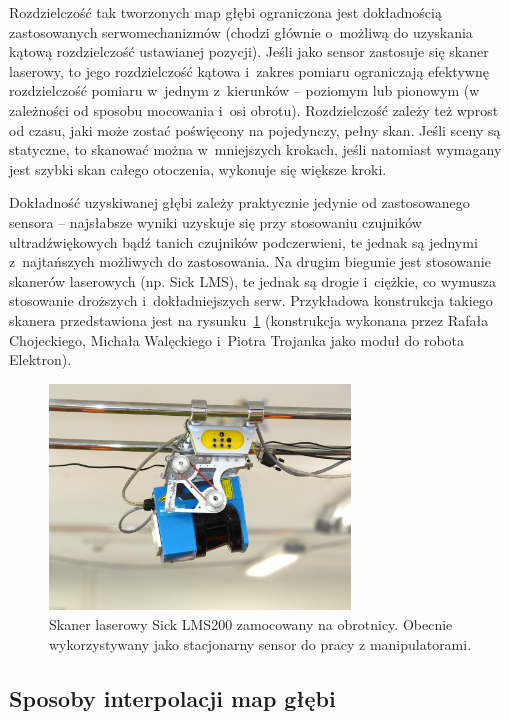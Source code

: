 Rozdzielczość tak tworzonych map głębi ograniczona jest dokładnością
zastosowanych serwomechanizmów (chodzi głównie o~możliwą do uzyskania
kątową rozdzielczość ustawianej pozycji). Jeśli jako sensor zastosuje się
skaner laserowy, to jego rozdzielczość kątowa i~zakres pomiaru ograniczają
efektywnę rozdzielczość pomiaru w~jednym z~kierunków -- poziomym lub pionowym
(w zależności od sposobu mocowania i~osi obrotu). Rozdzielczość zależy też
wprost od czasu, jaki może zostać poświęcony na pojedynczy, pełny skan. Jeśli
sceny są statyczne, to skanować można w~mniejszych krokach, jeśli natomiast
wymagany jest szybki skan całego otoczenia, wykonuje się większe kroki.

Dokładność uzyskiwanej głębi zależy praktycznie jedynie od
zastosowanego sensora -- najsłabsze wyniki uzyskuje się przy stosowaniu
czujników ultradźwiękowych bądź tanich czujników podczerwieni, te jednak są
jednymi z~najtańszych możliwych do zastosowania. Na drugim biegunie jest
stosowanie skanerów laserowych (np. Sick LMS), te jednak są drogie i~ciężkie, co
wymusza stosowanie droższych i~dokładniejszych serw. Przykładowa konstrukcja
takiego skanera przedstawiona jest na rysunku~\ref{fig:sick_obrotnica}
(konstrukcja wykonana przez Rafała Chojeckiego, Michała Walęckiego i~Piotra
Trojanka jako moduł do robota Elektron).

\begin{figure}[h!]
\centering
\includegraphics[height=6cm]{../../Common/img/sick_obrotnica}
\caption{Skaner laserowy Sick LMS200 zamocowany na obrotnicy. Obecnie wykorzystywany
jako stacjonarny sensor do pracy z manipulatorami.}
\label{fig:sick_obrotnica}
\end{figure}

\subsection{Sposoby interpolacji map głębi}

